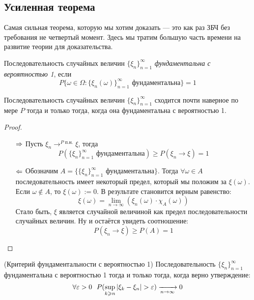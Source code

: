\subsection{Усиленная теорема}

\begin{note}
	Самая сильная теорема, которую мы хотим доказать --- это как раз ЗБЧ без требования не четвертый момент. Здесь мы тратим большую часть времени на развитие теории для доказательства.
\end{note}

\begin{definition}
	Последовательность случайных величин $\{\xi_n\}_{n = 1}^\infty$ \textit{фундаментальна с вероятностью 1}, если
	\[
		P\{\omega \in \Omega \colon \{\xi_n(\omega)\}_{n = 1}^\infty \text{ фундаментальна}\} = 1
	\]
\end{definition}

\begin{proposition}
	Последовательность случайных величин $\{\xi_n\}_{n = 1}^\infty$ сходится почти наверное по мере $P$ тогда и только тогда, когда она фундаментальна с вероятностью 1.
\end{proposition}

\begin{proof}~
	\begin{itemize}
		\item[$\Rightarrow$] Пусть $\xi_n \to^{P\text{ п.н.}} \xi$, тогда
		\[
			P(\{\xi_n\}_{n = 1}^\infty \text{ фундаментальна}) \ge P(\xi_n \to \xi) = 1
		\]
		
		\item [$\Leftarrow$] Обозначим $A = \{\{\xi_n\}_{n = 1}^\infty \text{ фундаментальна}\}$. Тогда $\forall \omega \in A$ последовательность имеет некоторый предел, который мы положим за $\xi(\omega)$. Если $\omega \notin A$, то $\xi(\omega) := 0$. В результате становится верным равенство:
		\[
			\xi(\omega) = \lim_{n \to \infty} (\xi_n(\omega) \cdot \chi_A(\omega))
		\]
		Стало быть, $\xi$ является случайной величиной как предел последовательности случайных величин. Ну и остаётся увидеть соотношение:
		\[
			P(\xi_n \to \xi) \ge P(A) = 1
		\]
	\end{itemize}
\end{proof}

\begin{theorem} (Критерий фундаментальности с вероятностью 1)
	Последовательность $\{\xi_n\}_{n = 1}^\infty$ фундаментальна с вероятностью 1 тогда и только тогда, когда верно утверждение:
	\[
		\forall \eps > 0\ \ P(\sup_{k \ge n} |\xi_k - \xi_n| > \eps) \xrightarrow[n \to \infty]{} 0
	\]
\end{theorem}

